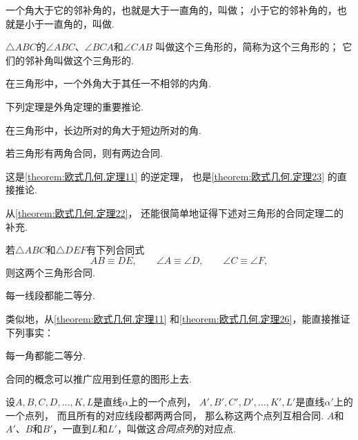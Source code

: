 \begin{definition}
一个角大于它的邻补角的，也就是大于一直角的，叫做；
小于它的邻补角的，也就是小于一直角的，叫做.
\end{definition}

\begin{definition}
\(\triangle ABC\)的\(\angle ABC\)、\(\angle BCA\)和\(\angle CAB\)
叫做这个三角形的，简称为这个三角形的；
它们的邻补角叫做这个三角形的.
\end{definition}

\begin{theorem}[外角定理]\label{theorem:欧式几何.定理22}
在三角形中，一个外角大于其任一不相邻的内角.
\end{theorem}

下列定理是外角定理的重要推论.

\begin{theorem}\label{theorem:欧式几何.定理23}
在三角形中，长边所对的角大于短边所对的角.
\end{theorem}

\begin{theorem}\label{theorem:欧式几何.定理24}
若三角形有两角合同，则有两边合同.
\end{theorem}
这是\cref{theorem:欧式几何.定理11} 的逆定理，
也是\cref{theorem:欧式几何.定理23} 的直接推论.

从\cref{theorem:欧式几何.定理22}，
还能很简单地证得下述对三角形的合同定理二的补充.
\begin{theorem}\label{theorem:欧式几何.定理25}
若\(\triangle ABC\)和\(\triangle DEF\)有下列合同式\[
	AB \equiv DE, \qquad
	\angle A \equiv \angle D, \qquad
	\angle C \equiv \angle F,
\]
则这两个三角形合同.
\end{theorem}

\begin{theorem}\label{theorem:欧式几何.定理26}
每一线段都能二等分.
\end{theorem}

类似地，从\cref{theorem:欧式几何.定理11} 和\cref{theorem:欧式几何.定理26}，能直接推证下列事实：
\begin{theorem}
每一角都能二等分.
\end{theorem}

合同的概念可以推广应用到任意的图形上去.

\begin{definition}
设\(A,B,C,D,\dotsc,K,L\)是直线\(\alpha\)上的一个点列，
\(A',B',C',D',\dotsc,K',L'\)是直线\(\alpha'\)上的一个点列，
而且所有的对应线段都两两合同，
那么称这两个点列互相合同.
\(A\)和\(A'\)、\(B\)和\(B'\)，一直到\(L\)和\(L'\)，叫做这\emph{合同点列}的对应点.
\end{definition}

